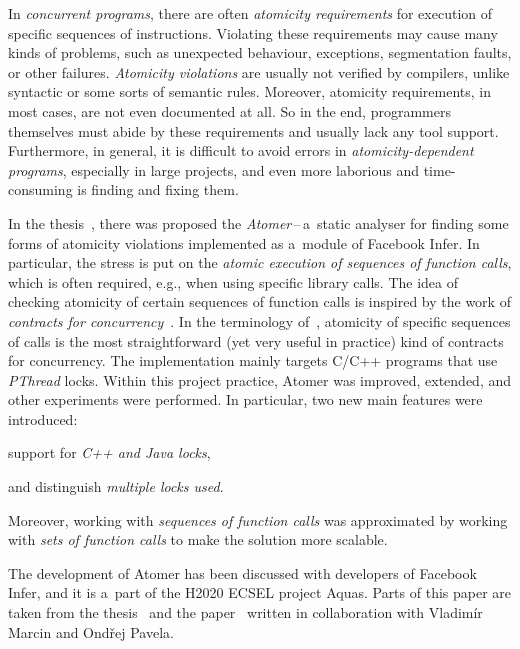 In \emph{concurrent programs}, there are often \emph{atomicity requirements}
for execution of specific sequences of instructions. Violating these
requirements may cause many kinds of problems, such as unexpected behaviour,
exceptions, segmentation faults, or other failures. \emph{Atomicity violations}
are usually not verified by compilers, unlike syntactic or some sorts of
semantic rules. Moreover, atomicity requirements, in most cases, are not
even documented at all. So in the end, programmers themselves must abide by
these requirements and usually lack any tool support. Furthermore, in general,
it is difficult to avoid errors in \emph{atomicity-dependent programs},
especially in large projects, and even more laborious and time-consuming is
finding and fixing them.

In the thesis~\cite{harmimBP}, there was proposed the
\emph{Atomer}\,--\,a~static analyser for finding some forms of atomicity
violations implemented as a~module of Facebook Infer. In particular, the
stress is put on the \emph{atomic execution of sequences of function
calls}, which is often required, e.g., when using specific library calls.
The idea of checking atomicity of certain sequences of function calls is
inspired by the work of \emph{contracts for
concurrency}~\cite{contracts2017}. In the terminology of~\cite{contracts2017},
atomicity of specific sequences of calls is the most straightforward (yet
very useful in practice) kind of contracts for concurrency. The implementation
mainly targets C/C++ programs that use \emph{PThread} locks. Within this
project practice, Atomer was improved, extended, and other experiments were
performed. In particular, two new main features were introduced:
\begin{enumerate*}[label={(\roman*)}]
    \item
        support for \emph{C++ and Java locks},

    \item
        and distinguish \emph{multiple locks used}.
\end{enumerate*}
Moreover, working with \emph{sequences of function calls} was approximated
by working with \emph{sets of function calls} to make the solution more
scalable.

The development of Atomer has been discussed with developers of Facebook
Infer, and it is a~part of the H2020 ECSEL project Aquas. Parts of this
paper are taken from the thesis~\cite{harmimBP} and the
paper~\cite{excel2019FBInfer} written in collaboration with Vladimír Marcin
and Ondřej Pavela.

